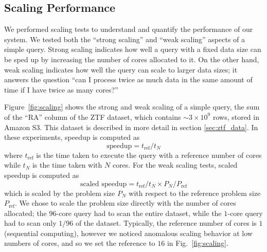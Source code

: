 \documentclass[twocolumn, linenumbers]{aastex631}
\begin{document}
\subsection{Scaling Performance}
\label{sec:scaling}

We performed scaling tests to understand and quantify the performance of our system. We tested both the ``strong scaling'' and ``weak scaling'' aspects of a simple query. Strong scaling indicates how well a query with a fixed data size can be sped up by increasing the number of cores allocated to it. On the other hand, weak scaling indicates how well the query can scale to larger data sizes; it answers the question ``can I process twice as much data in the same amount of time if I have twice as many cores?'' 

Figure~\ref{fig:scaling} shows the strong and weak scaling of a simple query, the sum of the ``RA'' column of the ZTF dataset, which contains ${\sim}3\times10^9$ rows, stored in Amazon S3. This dataset is described in more detail in section \ref{sec:ztf_data}. In these experiments, speedup is computed as
\begin{equation}
    \text{speedup} = t_{\text{ref}} / t_{N}
    \label{eqn:speedup}
\end{equation}
where $t_{\text{ref}}$ is the time taken to execute the query with a reference number of cores while $t_{N}$ is the time taken with $N$ cores. For the weak scaling tests, scaled speedup is computed as
\begin{equation}
    \text{scaled speedup} = t_{\text{ref}} / t_{N} \times P_{N} / P_{\text{ref}}
    \label{eqn:scaled_speedup}
\end{equation}
which is scaled by the problem size $P_N$ with respect to the reference problem size $P_{\text{ref}}$. We chose to scale the problem size directly with the number of cores allocated; the $96$-core query had to scan the entire dataset, while the $1$-core query had to scan only $1/96$ of the dataset. Typically, the reference number of cores is $1$ (sequential computing), however we noticed anomalous scaling behavior at low numbers of cores, and so we set the reference to $16$ in Fig.~\ref{fig:scaling}.
\end{document}
